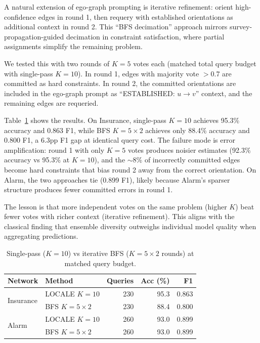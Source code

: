 \documentclass{article}
\begin{document}
A natural extension of ego-graph prompting is iterative refinement: orient high-confidence edges in round 1, then requery with established orientations as additional context in round 2. This ``BFS decimation'' approach mirrors survey-propagation-guided decimation in constraint satisfaction, where partial assignments simplify the remaining problem.

We tested this with two rounds of $K{=}5$ votes each (matched total query budget with single-pass $K{=}10$). In round 1, edges with majority vote $>$0.7 are committed as hard constraints. In round 2, the committed orientations are included in the ego-graph prompt as ``ESTABLISHED: $u \to v$'' context, and the remaining edges are requeried.

Table~\ref{tab:bfs} shows the results. On Insurance, single-pass $K{=}10$ achieves 95.3\% accuracy and 0.863 F1, while BFS $K{=}5 \times 2$ achieves only 88.4\% accuracy and 0.800 F1, a 6.3pp F1 gap at identical query cost. The failure mode is error amplification: round 1 with only $K{=}5$ votes produces noisier estimates (92.3\% accuracy vs 95.3\% at $K{=}10$), and the $\sim$8\% of incorrectly committed edges become hard constraints that bias round 2 away from the correct orientation. On Alarm, the two approaches tie (0.899 F1), likely because Alarm's sparser structure produces fewer committed errors in round 1.

The lesson is that more independent votes on the same problem (higher $K$) beat fewer votes with richer context (iterative refinement). This aligns with the classical finding that ensemble diversity outweighs individual model quality when aggregating predictions.

\begin{table}[h]
\centering
\caption{Single-pass ($K{=}10$) vs iterative BFS ($K{=}5 \times 2$ rounds) at matched query budget.}
\small
\begin{tabular}{llrrr}
\toprule
Network & Method & Queries & Acc (\%) & F1 \\
\midrule
\multirow{2}{*}{Insurance} & LOCALE $K{=}10$ & 230 & 95.3 & 0.863 \\
                           & BFS $K{=}5{\times}2$ & 230 & 88.4 & 0.800 \\
\midrule
\multirow{2}{*}{Alarm}     & LOCALE $K{=}10$ & 260 & 93.0 & 0.899 \\
                           & BFS $K{=}5{\times}2$ & 260 & 93.0 & 0.899 \\
\bottomrule
\end{tabular}
\label{tab:bfs}
\end{table}
\end{document}
